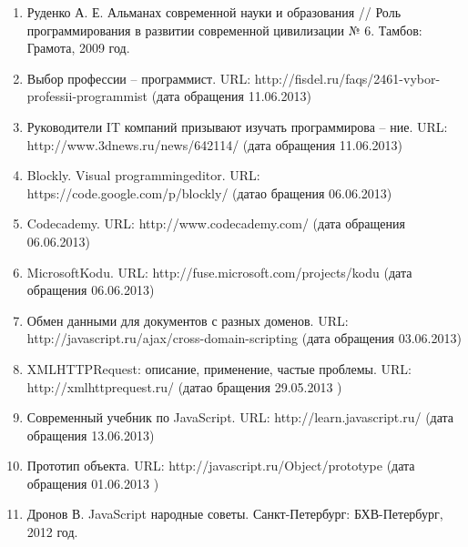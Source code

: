 \begin{enumerate}
\item	Руденко А. Е. Альманах современной науки и образования // Роль программирования в развитии современной цивилизации № 6. Тамбов: Грамота, 2009 год.
\item	Выбор профессии – программист. URL: http://fisdel.ru/faqs/2461-vybor-professii-programmist (дата обращения 11.06.2013)
\item	Руководители IT компаний призывают изучать программирова – ние. URL: http://www.3dnews.ru/news/642114/ (дата обращения 11.06.2013)
\item	Blockly. Visual programmingeditor. URL: https://code.google.com/p/blockly/ (датао бращения 06.06.2013)
\item	Codecademy. URL: http://www.codecademy.com/ (дата обращения 06.06.2013)
\item	MicrosoftKodu. URL: http://fuse.microsoft.com/projects/kodu (дата обращения 06.06.2013)
\item	Обмен данными для документов с разных доменов. URL: http://javascript.ru/ajax/cross-domain-scripting  (дата обращения 03.06.2013)
\item	XMLHTTPRequest: описание, применение, частые проблемы. URL: http://xmlhttprequest.ru/ (датао бращения 29.05.2013 )
\item	Современный учебник по JavaScript. URL: http://learn.javascript.ru/ (дата обращения  13.06.2013)
\item	Прототип объекта. URL: http://javascript.ru/Object/prototype (дата обращения 01.06.2013 )
\item	Дронов В. JavaScript народные советы. Санкт-Петербург: БХВ-Петербург, 2012 год.


\end{enumerate}
